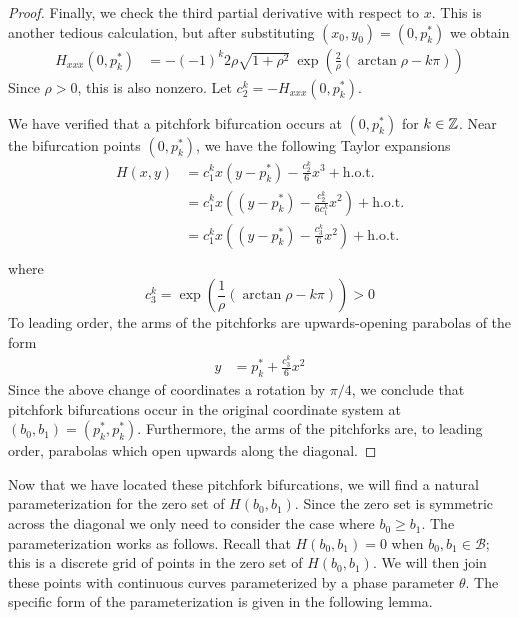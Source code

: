 \documentclass[thesis.tex]{subfiles}
\begin{document}
\begin{lemma}
\begin{proof}
Finally, we check the third partial derivative with respect to $x$. This is another tedious calculation, but after substituting $(x_0, y_0) = \left(0, p^*_k \right)$ we obtain
\begin{align*}
H_{xxx}(0, p_k^*)
&= -(-1)^k 2 \rho \sqrt{1 + \rho^2} \: \exp{\left(\frac{2}{\rho} (\arctan \rho - k \pi) \right)}
\end{align*}
Since $\rho > 0$, this is also nonzero. Let $c_2^k = -H_{xxx}(0, p^*_k)$.

We have verified that a pitchfork bifurcation occurs at $(0, p^*_k)$ for $k \in {\mathbb Z}$. Near the bifurcation points $(0, p_k^*)$, we have the following Taylor expansions
\begin{align*}
H(x, y) &= c_1^k x (y - p_k^*) - \frac{c_2^k}{6} x^3 + \text{h.o.t.} \\
&= c_1^k x \left( (y - p_k^*) - \frac{c_2^k}{6 c_1^k } x^2 \right) + \text{h.o.t.} \\
&= c_1^k x \left( (y - p_k^*) - \frac{c_3^k}{6} x^2 \right) + \text{h.o.t.} \\
\end{align*}
where
\begin{equation*}
c_3^k = \exp{\left(\frac{1}{\rho} (\arctan \rho - k \pi) \right)} > 0
\end{equation*}
To leading order, the arms of the pitchforks are upwards-opening parabolas of the form 
\begin{align*}
y &= p_k^* + \frac{c_3^k}{6} x^2
\end{align*}
Since the above change of coordinates a rotation by $\pi/4$, we conclude that pitchfork bifurcations occur in the original coordinate system at $(b_0, b_1) = (p_k^*, p_k^*)$. Furthermore, the arms of the pitchforks are, to leading order, parabolas which open upwards along the diagonal.
\end{proof}
\end{lemma}

Now that we have located these pitchfork bifurcations, we will find a natural parameterization for the zero set of $H(b_0, b_1)$. Since the zero set is symmetric across the diagonal we only need to consider the case where $b_0 \geq b_1$. The parameterization works as follows. Recall that $H(b_0, b_1) = 0$ when $b_0, b_1 \in \mathcal{B}$; this is a discrete grid of points in the zero set of $H(b_0, b_1)$. We will then join these points with continuous curves parameterized by a phase parameter $\theta$. The specific form of the parameterization is given in the following lemma.
\end{document}
